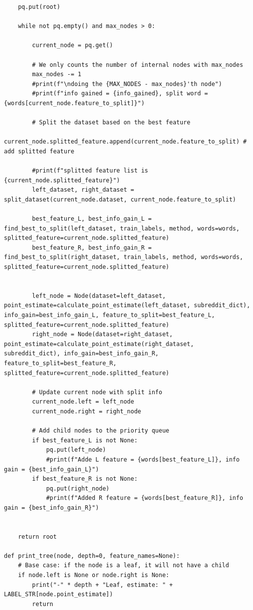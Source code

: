 \documentclass[10pt]{article}
\begin{document}
\begin{enumerate}
\begin{lstlisting}
    pq.put(root)

    while not pq.empty() and max_nodes > 0:
        
        current_node = pq.get()
        
        # We only counts the number of internal nodes with max_nodes
        max_nodes -= 1
        #print(f"\ndoing the {MAX_NODES - max_nodes}'th node")
        #print(f"info gained = {info_gained}, split word = {words[current_node.feature_to_split]}")
        
        # Split the dataset based on the best feature
        current_node.splitted_feature.append(current_node.feature_to_split) # add splitted feature

        #print(f"splitted feature list is  {current_node.splitted_feature}")
        left_dataset, right_dataset = split_dataset(current_node.dataset, current_node.feature_to_split)
        
        best_feature_L, best_info_gain_L = find_best_to_split(left_dataset, train_labels, method, words=words, splitted_feature=current_node.splitted_feature)
        best_feature_R, best_info_gain_R = find_best_to_split(right_dataset, train_labels, method, words=words, splitted_feature=current_node.splitted_feature)
        
        
        left_node = Node(dataset=left_dataset, point_estimate=calculate_point_estimate(left_dataset, subreddit_dict), info_gain=best_info_gain_L, feature_to_split=best_feature_L, splitted_feature=current_node.splitted_feature)
        right_node = Node(dataset=right_dataset, point_estimate=calculate_point_estimate(right_dataset, subreddit_dict), info_gain=best_info_gain_R, feature_to_split=best_feature_R, splitted_feature=current_node.splitted_feature)
        
        # Update current node with split info
        current_node.left = left_node
        current_node.right = right_node
        
        # Add child nodes to the priority queue
        if best_feature_L is not None:
            pq.put(left_node)
            #print(f"Adde L feature = {words[best_feature_L]}, info gain = {best_info_gain_L}")
        if best_feature_R is not None:
            pq.put(right_node)
            #print(f"Added R feature = {words[best_feature_R]}, info gain = {best_info_gain_R}")
        
    
    return root

def print_tree(node, depth=0, feature_names=None):
    # Base case: if the node is a leaf, it will not have a child
    if node.left is None or node.right is None:
        print("-" * depth + "Leaf, estimate: " + LABEL_STR[node.point_estimate])
        return


\end{lstlisting}
\end{enumerate}
\end{document}
